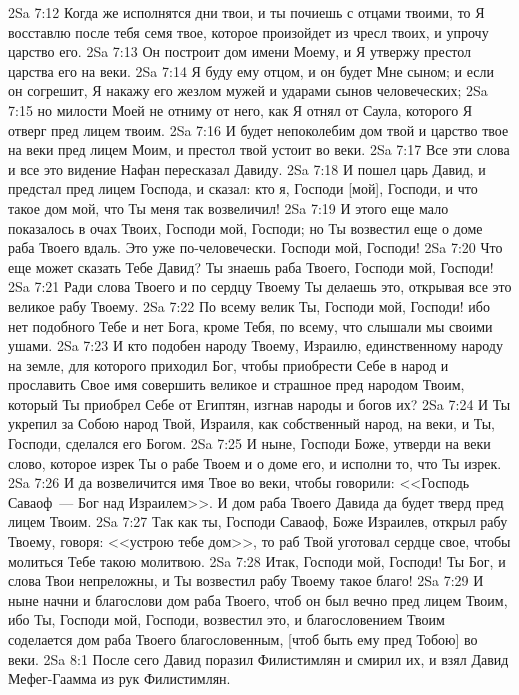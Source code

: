 \vs 2Sa 7:12 Когда же исполнятся дни твои, и ты почиешь с отцами твоими, то Я восставлю после тебя семя твое, которое произойдет из чресл твоих, и упрочу царство его.
\vs 2Sa 7:13 Он построит дом имени Моему, и Я утвержу престол царства его на веки.
\vs 2Sa 7:14 Я буду ему отцом, и он будет Мне сыном; и если он согрешит, Я накажу его жезлом мужей и ударами сынов человеческих;
\vs 2Sa 7:15 но милости Моей не отниму от него, как Я отнял от Саула, которого Я отверг пред лицем твоим.
\vs 2Sa 7:16 И будет непоколебим дом твой и царство твое на веки пред лицем Моим, и престол твой устоит во веки.
\vs 2Sa 7:17 Все эти слова и все это видение Нафан пересказал Давиду.
\rsbpar\vs 2Sa 7:18 И пошел царь Давид, и предстал пред лицем Господа, и сказал: кто я, Господи [мой], Господи, и что такое дом мой, что Ты меня так возвеличил!
\vs 2Sa 7:19 И этого еще мало показалось в очах Твоих, Господи мой, Господи; но Ты возвестил еще о доме раба Твоего вдаль. Это уже по-человечески. Господи мой, Господи!
\vs 2Sa 7:20 Что еще может сказать Тебе Давид? Ты знаешь раба Твоего, Господи мой, Господи!
\vs 2Sa 7:21 Ради слова Твоего и по сердцу Твоему Ты делаешь это, открывая все это великое рабу Твоему.
\vs 2Sa 7:22 По всему велик Ты, Господи мой, Господи! ибо нет подобного Тебе и нет Бога, кроме Тебя, по всему, что слышали мы своими ушами.
\vs 2Sa 7:23 И кто подобен народу Твоему, Израилю, единственному народу на земле, для которого приходил Бог, чтобы приобрести  Себе в народ и прославить Свое имя  совершить великое и страшное пред народом Твоим, который Ты приобрел Себе от Египтян, изгнав народы и богов их?
\vs 2Sa 7:24 И Ты укрепил за Собою народ Твой, Израиля, как собственный народ, на веки, и Ты, Господи, сделался его Богом.
\vs 2Sa 7:25 И ныне, Господи Боже, утверди на веки слово, которое изрек Ты о рабе Твоем и о доме его, и исполни то, что Ты изрек.
\vs 2Sa 7:26 И да возвеличится имя Твое во веки, чтобы говорили: <<Господь Саваоф~--- Бог над Израилем>>. И дом раба Твоего Давида да будет тверд пред лицем Твоим.
\vs 2Sa 7:27 Так как ты, Господи Саваоф, Боже Израилев, открыл рабу Твоему, говоря: <<устрою тебе дом>>, то раб Твой уготовал сердце свое, чтобы молиться Тебе такою молитвою.
\vs 2Sa 7:28 Итак, Господи мой, Господи! Ты Бог, и слова Твои непреложны, и Ты возвестил рабу Твоему такое благо!
\vs 2Sa 7:29 И ныне начни и благослови дом раба Твоего, чтоб он был вечно пред лицем Твоим, ибо Ты, Господи мой, Господи, возвестил это, и благословением Твоим соделается дом раба Твоего благословенным, [чтоб быть ему пред Тобою] во веки.
\vs 2Sa 8:1 После сего Давид поразил Филистимлян и смирил их, и взял Давид Мефег-Гаамма из рук Филистимлян.
